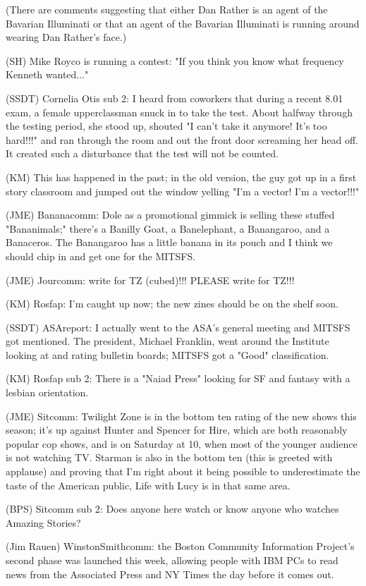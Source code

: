 \documentclass[12pt]{article}
\begin{document}
(There are comments suggesting that either Dan Rather is an agent of the Bavarian Illuminati or that an agent of the Bavarian Illuminati is running around wearing Dan Rather's face.)

(SH) Mike Royco is running a contest: "If you think you know what frequency Kenneth wanted..."

(SSDT) Cornelia Otis sub 2: I heard from coworkers that during a recent 8.01 exam, a female upperclassman snuck in to take the test. About halfway through the testing period, she stood up, shouted "I can't take it anymore! It's too hard!!!" and ran through the room and out the front door screaming her head off. It created such a disturbance that the test will not be counted.

(KM) This has happened in the past; in the old version, the guy got up in a first story classroom and jumped out the window yelling "I'm a vector! I'm a vector!!!"

(JME) Bananacomm: Dole as a promotional gimmick is selling these stuffed "Bananimals;" there's a Banilly Goat, a Banelephant, a Banangaroo, and a Banaceros. The Banangaroo has a little banana in its pouch and I think we should chip in and get one for the MITSFS.

(JME) Jourcomm: write for TZ (cubed)!!! PLEASE write for TZ!!!

(KM) Rosfap: I'm caught up now; the new zines should be on the shelf soon.

(SSDT) ASAreport: I actually went to the ASA's general meeting and MITSFS got mentioned. The president, Michael Franklin, went around the Institute looking at and rating bulletin boards; MITSFS got a "Good" classification.

(KM) Rosfap sub 2: There is a "Naiad Press" looking for SF and fantasy with a lesbian orientation.

(JME) Sitcomm: Twilight Zone is in the bottom ten rating of the new shows this season; it's up against Hunter and Spencer for Hire, which are both reasonably popular cop shows, and is on Saturday at 10, when most of the younger audience is not watching TV. Starman is also in the bottom ten (this is greeted with applause) and proving that I'm right about it being possible to underestimate the taste of the American public, Life with Lucy is in that same area.

(BPS) Sitcomm sub 2: Does anyone here watch or know anyone who watches Amazing Stories?

(Jim Rauen) WinstonSmithcomm: the Boston Community Information Project's second phase was launched this week, allowing people with IBM PCs to read news from the Associated Press and NY Times the day before it comes out.
\end{document}
